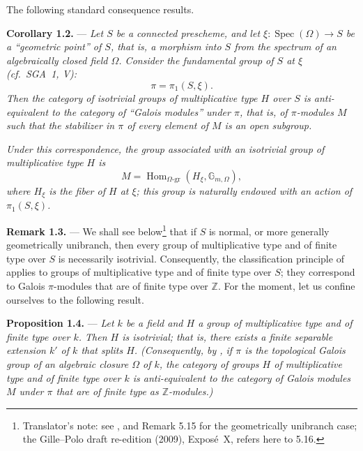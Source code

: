 The following standard consequence results.

\medskip
\noindent{}%
\textbf{Corollary 1.2.} ---
\textit{Let \(S\) be a connected prescheme, and let
\(\xi:\operatorname{Spec}(\Omega)\to S\) be a ``geometric point'' of
\(S\), that is, a morphism into \(S\) from the spectrum of an
algebraically closed field \(\Omega\). Consider the fundamental group
of \(S\) at \(\xi\) (cf.\ SGA~1, V):
\[
  \pi=\pi_1(S,\xi).
\]
Then the category of isotrivial groups of multiplicative type \(H\)
over \(S\) is anti-equivalent to the category of ``Galois modules''
under \(\pi\), that is, of \(\pi\)-modules \(M\) such that the
stabilizer in \(\pi\) of every element of \(M\) is an open subgroup.}

\textit{Under this correspondence, the group associated with an
isotrivial group of multiplicative type \(H\) is
\[
  M=\operatorname{Hom}_{\Omega\text{-}\mathrm{gr}}
       (H_\xi,\mathbb G_{m,\Omega}),
\]
where \(H_\xi\) is the fiber of \(H\) at \(\xi\); this group is
naturally endowed with an action of \(\pi_1(S,\xi)\).}

\medskip
\noindent{}%
\textbf{Remark 1.3.} ---
We shall see below\footnote{Translator's note: see
, and Remark 5.15 for the geometrically unibranch
case; the Gille--Polo draft re-edition (2009), Expos\'e~X, refers here to
5.16.} that if \(S\) is normal, or more
generally geometrically unibranch, then every group of multiplicative
type and of finite type over \(S\) is necessarily isotrivial.
Consequently, the classification principle of  applies to groups of
multiplicative type and of finite type over \(S\); they correspond to
Galois \(\pi\)-modules that are of finite type over \(\mathbb Z\). For
the moment, let us confine ourselves to the following result.

\medskip
\noindent{}%
\textbf{Proposition 1.4.} ---
\textit{Let \(k\) be a field and \(H\) a group of multiplicative type
and of finite type over \(k\). Then \(H\) is isotrivial; that is, there
exists a finite separable extension \(k'\) of \(k\) that splits \(H\).
(Consequently, by , if \(\pi\) is the topological Galois
group of an algebraic closure \(\Omega\) of \(k\), the category of
groups \(H\) of multiplicative type and of finite type over \(k\) is
anti-equivalent to the category of Galois modules \(M\) under \(\pi\)
that are of finite type as \(\mathbb Z\)-modules.)}

